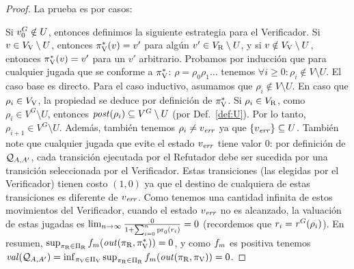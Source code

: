 \begin{proof} La prueba es por casos:
	
	Si $v_0^G \notin U$, entonces definimos la siguiente estrategia para el Verificador. Si $v \in V_{\mathrm{V}} \setminus U$, entonces $\pi^*_{\mathrm{V}}(v)=v'$ 
	para algún $v' \in V_{\mathrm{R}} \setminus U$, y si $v \notin  V_{\mathrm{V}} \setminus U$, entonces $\pi^*_{\mathrm{V}}(v) = v'$ para un $v'$ arbitrario. 
	Probamos por inducción que para cualquier jugada que se conforme a $\pi^*_{\mathrm{V}}$: $\rho =\rho_0 \rho_1 \dots$ tenemos $\forall i \geq 0: \rho_i \notin V \setminus U$. El caso base es directo. 
Para el caso inductivo, asumamos que $\rho_i \notin V \setminus U$. En caso que $\rho_i \in V_{\mathrm{V}}$, la propiedad se deduce por definición de
$\pi^*_{\mathrm{V}}$. Si $\rho_i \in V_{\mathrm{R}}$, como $\rho_i \in V^G \setminus U$, entonces $\mathit{post}(\rho_i) \subseteq V^G \setminus U$ (por Def.~\ref{def:U}). 
Por lo tanto, $\rho_{i+1} \in V^G \setminus U$. 
	 Además, también tenemos $\rho_i \neq v_{\mathit{err}}$ ya que $\{ v_{\mathit{err}} \} \subseteq U$. También note que cualquier jugada que evite el estado $v_{\mathit{err}}$ tiene valor $0$: por definición de $\mathcal{Q}_{A, A'}$, cada transición ejecutada por el Refutador debe ser sucedida por una transición seleccionada por el Verificador. Estas transiciones (las elegidas por el Verificador) tienen costo $(1,0)$ ya que el destino de cualquiera de estas transiciones es diferente de $v_{\mathit{err}}$. Como tenemos una cantidad infinita de estos movimientos del Verificador, cuando el estado $v_{\mathit{err}}$ no es alcanzado, la valuación de estas jugadas es $\lim_{n\rightarrow \infty} \frac{0}{1+ \sum^n_{i=0} \operatorname{pr}_{0}(r_i)} = 0$ (recordemos que $r_i = \mathit{r}^G(\rho_i)$). 
En resumen, $\sup_{\pi_{\mathrm{R}} \in \Pi_{\mathrm{R}}} f_{m}(\mathit{out}(\pi_{\mathrm{R}}, \pi^*_{\mathrm{V}})) = 0$, y como $f_{m}$ es positiva
tenemos $\mathit{val}(\mathcal{Q}_{A, A'}) = \inf_{\pi_{\mathrm{V}} \in \Pi_{\mathrm{V}}} \sup_{\pi_{\mathrm{R}} \in \Pi_{\mathrm{R}}} f_{m}(\mathit{out}(\pi_{\mathrm{R}}, \pi_{\mathrm{V}})) = 0$.


\end{proof}
